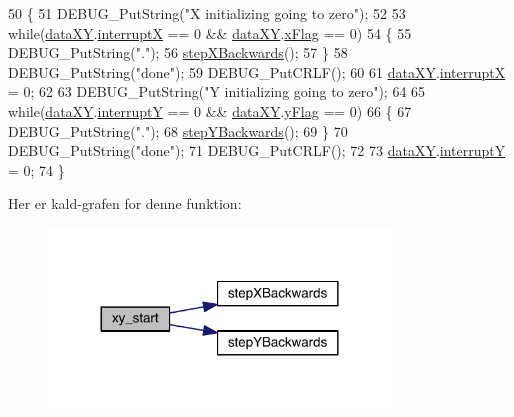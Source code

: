 \begin{DoxyCode}
50 \{
51   DEBUG\_PutString(\textcolor{stringliteral}{"X initializing going to zero"});
52   
53   \textcolor{keywordflow}{while}(\hyperlink{data_8h_a89d7998a721b3f36f9f4131e7a5e42d2}{dataXY}.\hyperlink{data_8h_a4cacb2964bb4b589bf79aa64a398725b}{interruptX} == 0 && \hyperlink{data_8h_a89d7998a721b3f36f9f4131e7a5e42d2}{dataXY}.\hyperlink{data_8h_abd60bb18cb69d4a782e0334caad9ffbc}{xFlag} == 0)
54   \{
55     DEBUG\_PutString(\textcolor{stringliteral}{"."});
56     \hyperlink{class_x_y_a30e07320705aa878e1f5a1b959eba099}{stepXBackwards}();
57   \}
58   DEBUG\_PutString(\textcolor{stringliteral}{"done"});
59   DEBUG\_PutCRLF();
60   
61   \hyperlink{data_8h_a89d7998a721b3f36f9f4131e7a5e42d2}{dataXY}.\hyperlink{data_8h_a4cacb2964bb4b589bf79aa64a398725b}{interruptX} = 0;
62   
63   DEBUG\_PutString(\textcolor{stringliteral}{"Y initializing going to zero"});
64   
65   \textcolor{keywordflow}{while}(\hyperlink{data_8h_a89d7998a721b3f36f9f4131e7a5e42d2}{dataXY}.\hyperlink{data_8h_a0149ea97a32442280eb1c0b30c1eeaf1}{interruptY} == 0 && \hyperlink{data_8h_a89d7998a721b3f36f9f4131e7a5e42d2}{dataXY}.\hyperlink{data_8h_a2093b99c34cd9ec2a282b9c4c3f61935}{yFlag} == 0)
66   \{
67     DEBUG\_PutString(\textcolor{stringliteral}{"."});
68     \hyperlink{class_x_y_aea96dacda1955992c5436dcb829daa26}{stepYBackwards}();
69   \}
70   DEBUG\_PutString(\textcolor{stringliteral}{"done"});
71   DEBUG\_PutCRLF();
72   
73   \hyperlink{data_8h_a89d7998a721b3f36f9f4131e7a5e42d2}{dataXY}.\hyperlink{data_8h_a0149ea97a32442280eb1c0b30c1eeaf1}{interruptY} = 0;
74 \}
\end{DoxyCode}


Her er kald-\/grafen for denne funktion\+:
\nopagebreak
\begin{figure}[H]
\begin{center}
\leavevmode
\includegraphics[width=257pt]{db/d87/class_x_y_a47c6cc7fae92395e4d1231428c7070d4_cgraph}
\end{center}
\end{figure}




